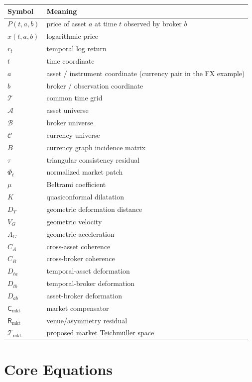 \documentclass[11pt,a4paper]{article}
\numberwithin{equation}{section}
\newcommand{\Tgrid}{\mathcal{T}}
\newcommand{\Aset}{\mathcal{A}}
\newcommand{\Bset}{\mathcal{B}}
\newcommand{\Cset}{\mathcal{C}}
\newcommand{\Tmkt}{\mathcal{T}_{\mathrm{mkt}}}
\begin{document}
\begin{longtable}{ll}
\toprule
Symbol & Meaning\\
\midrule
$P(t,a,b)$ & price of asset $a$ at time $t$ observed by broker $b$\\
$x(t,a,b)$ & logarithmic price\\
$r_t$ & temporal log return\\
$t$ & time coordinate\\
$a$ & asset / instrument coordinate (currency pair in the FX
      example)\\
$b$ & broker / observation coordinate\\
$\Tgrid$ & common time grid\\
$\Aset$ & asset universe\\
$\Bset$ & broker universe\\
$\Cset$ & currency universe\\
$B$ & currency graph incidence matrix\\
$\tau$ & triangular consistency residual\\
$\Phi_t$ & normalized market patch\\
$\mu$ & Beltrami coefficient\\
$K$ & quasiconformal dilatation\\
$D_T$ & geometric deformation distance\\
$V_G$ & geometric velocity\\
$A_G$ & geometric acceleration\\
$C_A$ & cross-asset coherence\\
$C_B$ & cross-broker coherence\\
$D_{ta}$ & temporal-asset deformation\\
$D_{tb}$ & temporal-broker deformation\\
$D_{ab}$ & asset-broker deformation\\
$\mathsf{C}_{\mathrm{mkt}}$ & market compensator\\
$\mathsf{R}_{\mathrm{mkt}}$ & venue/asymmetry residual\\
$\Tmkt$ & proposed market Teichmüller space\\
\bottomrule
\end{longtable}

\section{Core Equations}
\end{document}
